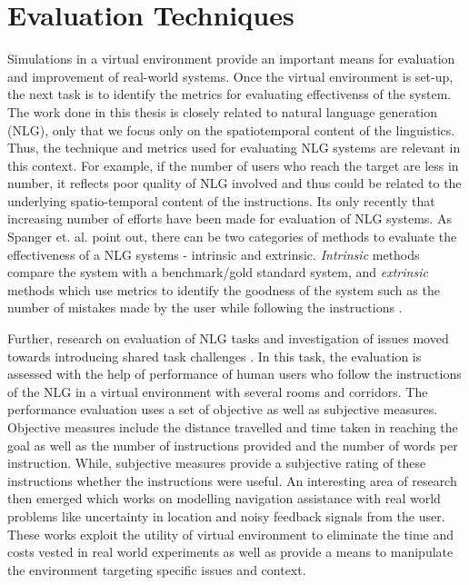 \documentclass{iitkthesis}
\begin{document}
 \section{Evaluation Techniques}
Simulations in a virtual environment provide an important means for evaluation and improvement of real-world systems. Once the virtual environment is set-up, the next task is to identify the metrics for evaluating effectivenss of the system. The work done in this thesis is closely related to natural language generation (NLG), only that we focus only on the spatiotemporal content of the linguistics. Thus, the technique and metrics used for evaluating NLG systems are relevant in this context. For example, if the number of users who reach the target are less in number, it reflects poor quality of NLG involved and thus could be related to the underlying spatio-temporal content of the instructions. Its only recently that increasing number of efforts have been made for evaluation of NLG systems. As Spanger et. al. \cite{spanger} point out, there can be two categories of methods to evaluate the effectiveness of a NLG systems - intrinsic and extrinsic. \textit{Intrinsic} methods compare the system with a benchmark/gold standard system, and \textit{extrinsic} methods which use metrics to identify the goodness of the system such as the number of mistakes made by the user while following the instructions \cite{young}. 

Further, research on evaluation of NLG tasks and investigation of issues moved towards introducing shared task challenges \cite{give}. In this task, the evaluation is assessed with the help of performance of human users who follow the instructions of the NLG in a virtual environment with several rooms and corridors. The performance evaluation uses a set of objective as well as subjective measures. Objective measures include the distance travelled and time taken in reaching the goal as well as the number of instructions provided and the number of words per instruction. While, subjective measures provide a subjective rating of these instructions whether the instructions were useful. An interesting area of research \cite{GRUVE} then emerged which works on modelling navigation assistance with real world problems like uncertainty in location and noisy feedback signals from the user. These works exploit the utility of virtual environment to eliminate the time and costs vested in real world experiments as well as provide a means to manipulate the environment targeting specific issues and context.
\end{document}
